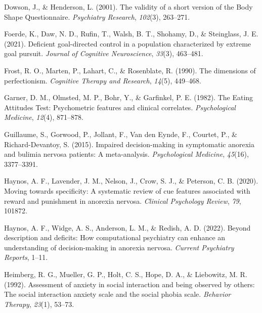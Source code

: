 \documentclass[
  man,floatsintext]{apa6}
\newlength{\cslhangindent}
\newlength{\cslentryspacingunit} %
\newenvironment{CSLReferences}[2] %
 {%
  \setlength{\parindent}{0pt}
  \ifodd #1
  \let\oldpar\par
  \def\par{\hangindent=\cslhangindent\oldpar}
  \fi
  \setlength{\parskip}{#2\cslentryspacingunit}
 }%
 {}
\begin{document}
\begin{CSLReferences}{1}{0}
\leavevmode{}%
Dowson, J., \& Henderson, L. (2001). The validity of a short version of the {Body Shape Questionnaire}. \emph{Psychiatry Research}, \emph{102}(3), 263--271.

\leavevmode{}%
Foerde, K., Daw, N. D., Rufin, T., Walsh, B. T., Shohamy, D., \& Steinglass, J. E. (2021). Deficient goal-directed control in a population characterized by extreme goal pursuit. \emph{Journal of Cognitive Neuroscience}, \emph{33}(3), 463--481.

\leavevmode{}%
Frost, R. O., Marten, P., Lahart, C., \& Rosenblate, R. (1990). The dimensions of perfectionism. \emph{Cognitive Therapy and Research}, \emph{14}(5), 449--468.

\leavevmode{}%
Garner, D. M., Olmsted, M. P., Bohr, Y., \& Garfinkel, P. E. (1982). The {Eating} {Attitudes} {Test}: Psychometric features and clinical correlates. \emph{Psychological Medicine}, \emph{12}(4), 871--878.

\leavevmode{}%
Guillaume, S., Gorwood, P., Jollant, F., Van den Eynde, F., Courtet, P., \& Richard-Devantoy, S. (2015). Impaired decision-making in symptomatic anorexia and bulimia nervosa patients: A meta-analysis. \emph{Psychological Medicine}, \emph{45}(16), 3377--3391.

\leavevmode{}%
Haynos, A. F., Lavender, J. M., Nelson, J., Crow, S. J., \& Peterson, C. B. (2020). Moving towards specificity: A systematic review of cue features associated with reward and punishment in anorexia nervosa. \emph{Clinical Psychology Review}, \emph{79}, 101872.

\leavevmode{}%
Haynos, A. F., Widge, A. S., Anderson, L. M., \& Redish, A. D. (2022). Beyond description and deficits: How computational psychiatry can enhance an understanding of decision-making in anorexia nervosa. \emph{Current Psychiatry Reports}, 1--11.

\leavevmode{}%
Heimberg, R. G., Mueller, G. P., Holt, C. S., Hope, D. A., \& Liebowitz, M. R. (1992). Assessment of anxiety in social interaction and being observed by others: The social interaction anxiety scale and the social phobia scale. \emph{Behavior Therapy}, \emph{23}(1), 53--73.


\end{CSLReferences}
\end{document}
